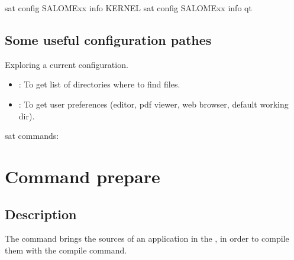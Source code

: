 \documentclass[a4paper,10pt,english]{sphinxmanual}
\begin{document}
%
\begin{sphinxVerbatim}[commandchars=\\\{\}]
sat config SALOME\PYGZhy{}xx \PYGZhy{}\PYGZhy{}info KERNEL
sat config SALOME\PYGZhy{}xx \PYGZhy{}\PYGZhy{}info qt
\end{sphinxVerbatim}


\subsection{Some useful configuration pathes}
\label{\detokenize{commands/config:some-useful-configuration-pathes}}
Exploring a current configuration.
\begin{itemize}
\item {} 
: To get list of directories where to find files.

\item {} 
: To get user preferences (editor, pdf viewer, web browser, default working dir).

\end{itemize}

sat commands:

%
\begin{sphinxVerbatim}[commandchars=\\\{\}]
    
    
\end{sphinxVerbatim}

\clearpage


\section{Command prepare}
\label{\detokenize{commands/prepare:svn}}\label{\detokenize{commands/prepare:command-prepare}}\label{\detokenize{commands/prepare::doc}}

\subsection{Description}
\label{\detokenize{commands/prepare:description}}
The  command brings the sources of an application in the , in order to compile them with the compile command.
\end{document}
